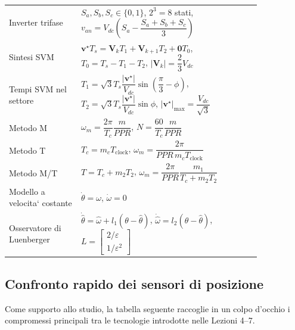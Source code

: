 \documentclass[11pt,a4paper]{article}
\begin{document}
{\begin{longtable}{>{\raggedright\arraybackslash}p{0.24\linewidth}>{\raggedright\arraybackslash}p{0.60\linewidth}}
Inverter trifase & $S_a,S_b,S_c\in\{0,1\}$, \quad $2^3=8$ stati, \quad $v_{an}=V_{dc}\left(S_a-\dfrac{S_a+S_b+S_c}{3}\right)$ \\
Sintesi SVM & $\mathbf v^\star T_s=\mathbf V_kT_1+\mathbf V_{k+1}T_2+\mathbf 0T_0$, \quad $T_0=T_s-T_1-T_2$, \quad $|\mathbf V_k|=\dfrac{2}{3}V_{dc}$ \\
Tempi SVM nel settore & $T_1=\sqrt3T_s\dfrac{|\mathbf v^\star|}{V_{dc}}\sin\left(\dfrac{\pi}{3}-\phi\right)$, \quad $T_2=\sqrt3T_s\dfrac{|\mathbf v^\star|}{V_{dc}}\sin\phi$, \quad $|\mathbf v^\star|_{\max}=\dfrac{V_{dc}}{\sqrt3}$ \\
Metodo M & $\omega_m=\dfrac{2\pi}{T_c}\dfrac{m}{PPR}$, \quad $N=\dfrac{60}{T_c}\dfrac{m}{PPR}$ \\
Metodo T & $T_c=m_cT_{\text{clock}}$, \quad $\omega_m=\dfrac{2\pi}{PPR\,m_cT_{\text{clock}}}$ \\
Metodo M/T & $T=T_c+m_2T_2$, \quad $\omega_m=\dfrac{2\pi}{PPR}\dfrac{m_1}{T_c+m_2T_2}$ \\
Modello a velocita` costante & $\dot\theta=\omega$, \quad $\dot\omega=0$ \\
Osservatore di Luenberger & $\dot{\hat\theta}=\hat\omega+l_1(\theta-\hat\theta)$, \quad $\dot{\hat\omega}=l_2(\theta-\hat\theta)$, \quad $L=\begin{bmatrix}2/\varepsilon\\ 1/\varepsilon^2\end{bmatrix}$ \\
\bottomrule
\end{longtable}
}

\subsection*{Confronto rapido dei sensori di posizione}

Come supporto allo studio, la tabella seguente raccoglie in un colpo d’occhio i compromessi principali tra le tecnologie introdotte nelle Lezioni 4--7.
\end{document}
